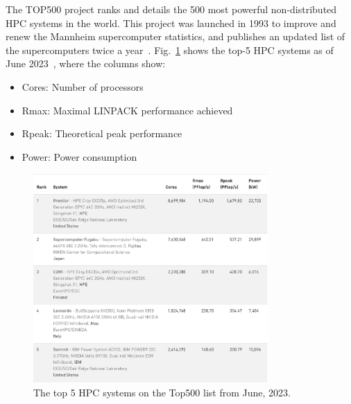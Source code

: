 \par
The TOP500 project ranks and details the 500 most powerful non-distributed HPC systems in the world.
This project was launched in 1993 to improve and renew the Mannheim supercomputer statistics, and publishes an updated list of the supercomputers twice a year~\cite{top500_1}.
Fig.~\ref{fig:supercomputer_top5} shows the top-5 HPC systems as of June 2023~\cite{top500_2}, where the columns show:
\begin{itemize}
    \item Cores: Number of processors
    \item Rmax: Maximal LINPACK performance achieved
    \item Rpeak: Theoretical peak performance
    \item Power: Power consumption
\end{itemize}


\begin{figure}[htbp]
\centering\includegraphics[width=0.8\textwidth]{fig_logo_history/supercomputer_top5.png}
\caption{The top 5 HPC systems on the Top500 list from June, 2023.}\label{fig:supercomputer_top5}
\end{figure}


